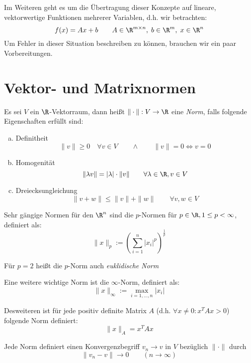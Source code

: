 \documentclass{mycourse}
\begin{document}
Im Weiteren geht es um die Übertragung dieser Konzepte auf lineare, vektorwertige Funktionen mehrerer Variablen, d.h. wir betrachten:
\[
f(x)=Ax+b \qquad A\in\R^{m\times n},\; b\in\R^m,\; x\in\R^n
\]
Um Fehler in dieser Situation beschreiben zu können, brauchen wir ein paar Vorbereitungen.

\section{Vektor- und Matrixnormen}

\begin{df}
\label{df:2.7}
Es sei $V$ ein $\R$-Vektorraum, dann heißt $\|\cdot\|:V\to \R$ eine \emph{Norm}, falls folgende Eigenschaften erfüllt sind:
\begin{enumerate}[(a)]
\item Definitheit
	\[
		\|v\|\ge 0 \quad \forall v\in V \qquad \land \qquad \|v\|=0\iff v=0
	\]
\item Homogenität
	\[
		\|\lambda v\|=|\lambda|\cdot \|v\| \qquad \forall\lambda\in\R,v\in V
	\]
\item Dreiecksungleichung 
	\[
		\|v+w\|\le\|v\|+\|w\| \qquad \forall v,w\in V
	\]
\end{enumerate}
\end{df}

\begin{ex}[$p$-Norm]
	\label{ex:2.8}
	Sehr gängige Normen für den $\R^n$ sind die $p$-Normen für $p\in\R, 1\le p<\infty$, definiert als:
	\[
	\|x\|_p := \left(\sum_{i=1}^n\left|x_i\right|^p\right)^{\frac 1p}
	\]
	\begin{note}
		Für $p=2$ heißt die $p$-Norm auch \emph{euklidische Norm}
	\end{note}
\end{ex}
\begin{ex*}
	Eine weitere wichtige Norm ist die $\infty$-Norm, definiert als:
	\[
	\|x\|_\infty := \max_{i=1,\dotsc,n}|x_i|
	\]
\end{ex*}
\begin{ex*}
	Desweiteren ist für jede positiv definite Matrix $A$ (d.h. $\forall x\neq 0:x^TAx > 0$) folgende Norm definiert:
	\[
		\|x\|_A = x^TAx
	\]
\end{ex*}

Jede Norm definiert einen Konvergenzbegriff $v_n\to v$ in $V$ bezüglich $\|\cdot\|$ durch
\[
\|v_n-v\|\to 0 \qquad (n\to\infty)
\]
\end{document}

